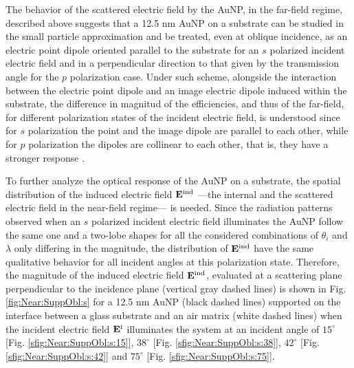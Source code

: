The behavior of the scattered electric field by the AuNP, in the far-field regime, described above suggests that a 12.5 nm AuNP on a substrate can be studied in the small particle approximation and be treated, even at oblique incidence, as an electric point dipole oriented  parallel to the substrate for an $s$ polarized incident electric field and in a perpendicular direction to that given by the transmission angle for the $p$ polarization case. Under such scheme, alongside the interaction between the electric point dipole and an image electric dipole induced within the substrate, the difference in magnitud of the efficiencies, and thus of the far-field, for different polarization states of the incident electric field,  is understood since for $s$ polarization the point and the image dipole are parallel to each other, while for  $p$ polarization the dipoles are collinear to each other, that is, they have a stronger response \textcolor{black}{ }.

To further analyze the optical response of the AuNP on a substrate, the spatial distribution of the induced electric field $\vb{E}^\text{ind}$ ---the internal and the scattered electric field in the near-field regime--- is needed. Since the radiation patterns observed when an $s$ polarized incident electric field illuminates the AuNP follow the same one and a two-lobe shapes for all the considered combinations of $\theta_i$ and $\lambda$ only differing in the magnitude, the distribution of $\vb{E}^\text{ind}$  have the same qualitative behavior for all incident angles at this polarization state. Therefore, the magnitude of the induced electric field $\vb{E}^\text{ind}$, evaluated at a scattering plane perpendicular to the incidence plane (vertical gray dashed lines) is shown in Fig. \ref{fig:Near:SuppObl:s} for a 12.5 nm AuNP (black dashed lines) supported on the interface between a glass substrate and an air matrix (white dashed lines) when the incident electric field $\vb{E}^\text{i}$ illuminates the system at an incident angle of $15^\circ$ [Fig. \ref{sfig:Near:SuppObl:s:15}], $38^\circ$ [Fig. \ref{sfig:Near:SuppObl:s:38}], $42^\circ$ [Fig. \ref{sfig:Near:SuppObl:s:42}]  and $75^\circ$ [Fig. \ref{sfig:Near:SuppObl:s:75}].

